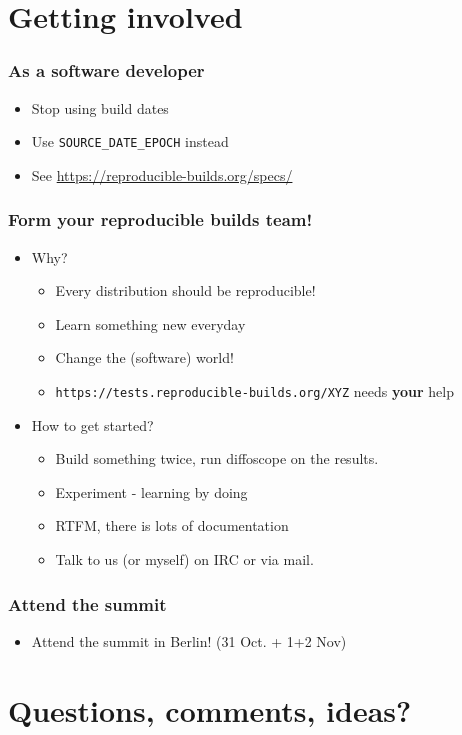 \documentclass[14pt,aspectratio=169]{beamer}
\begin{document}
\section{Getting involved}


\begin{frame}
 \frametitle{As a software developer}
 \begin{itemize}
  \item Stop using build dates
  \item Use \texttt{SOURCE\_DATE\_EPOCH} instead
  \item See \url{https://reproducible-builds.org/specs/}
 \end{itemize}
\end{frame}


\begin{frame}
 \frametitle{Form your reproducible builds team!}
 \begin{itemize}
  \item Why?
   \begin{itemize}
    \item Every distribution should be reproducible!
    \item Learn something new everyday
    \item Change the (software) world!
    \item \texttt{https://tests.reproducible-builds.org/XYZ} needs \textbf{your} help
   \end{itemize}
  \item How to get started?
   \begin{itemize}
    \item Build something twice, run diffoscope on the results.
    \item Experiment - learning by doing
    \item RTFM, there is lots of documentation
    \item Talk to us (or myself) on IRC or via mail.
   \end{itemize}
 \end{itemize}
\end{frame}

\begin{frame}
 \frametitle{Attend the summit}
 \begin{itemize}
  \item Attend the summit in Berlin! (31 Oct. + 1+2 Nov)
 \end{itemize}
\end{frame}

\section{Questions, comments, ideas?}
\end{document}
